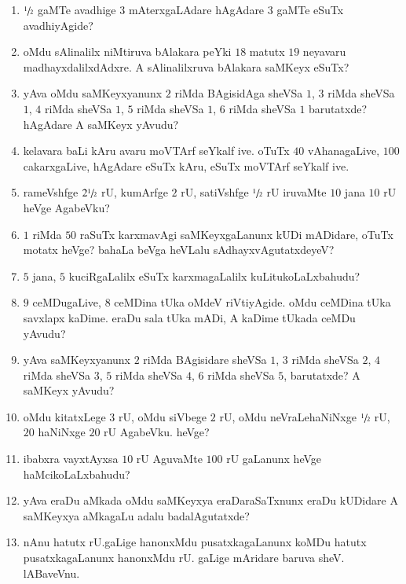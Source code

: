 \begin{enumerate}
\item $\sfrac{1}{2}$ gaMTe avadhige $3$ mAterxgaLAdare hAgAdare $3$ gaMTe eSuTx avadhiyAgide?

\item oMdu sAlinalilx niMtiruva bAlakara peYki $18$ matutx $19$ neyavaru madhayxdalilxdAdxre. A sAlinalilxruva bAlakara saMKeyx eSuTx?

\item yAva oMdu saMKeyxyanunx $2$ riMda BAgisidAga sheVSa $1$, $3$ riMda sheVSa $1$, $4$ riMda sheVSa $1$, $5$ riMda sheVSa $1$, $6$ riMda sheVSa $1$ barutatxde? hAgAdare A saMKeyx yAvudu?

\item kelavara baLi kAru avaru moVTArf seYkalf ive. oTuTx $40$ vAhanagaLive, $100$ cakarxgaLive, hAgAdare eSuTx kAru, eSuTx moVTArf seYkalf ive.

\item rameVshfge $2\sfrac{1}{2}$ rU, kumArfge $2$ rU, satiVshfge $\sfrac{1}{2}$ rU iruvaMte $10$ jana $10$ rU heVge AgabeVku?

\item $1$ riMda $50$ raSuTx karxmavAgi saMKeyxgaLanunx kUDi mADidare, oTuTx motatx heVge? bahaLa beVga heVLalu sAdhayxvAgutatxdeyeV?

\item $5$ jana, $5$ kuciRgaLalilx eSuTx karxmagaLalilx kuLitukoLaLxbahudu?

\item $9$ ceMDugaLive, $8$ ceMDina tUka oMdeV riVtiyAgide. oMdu ceMDina tUka savxlapx kaDime. eraDu sala tUka mADi, A kaDime tUkada ceMDu yAvudu?

\item yAva saMKeyxyanunx $2$ riMda BAgisidare sheVSa $1$, $3$ riMda sheVSa $2$, $4$ riMda sheVSa $3$, $5$ riMda sheVSa $4$, $6$ riMda sheVSa $5$, barutatxde? A saMKeyx yAvudu?

\item oMdu kitatxLege $3$ rU, oMdu siVbege $2$ rU, oMdu neVraLehaNiNxge $\sfrac{1}{2}$ rU, $20$ haNiNxge $20$ rU AgabeVku. heVge?

\item ibabxra vayxtAyxsa $10$ rU AguvaMte $100$ rU gaLanunx heVge haMcikoLaLxbahudu?

\item yAva eraDu aMkada oMdu saMKeyxya eraDaraSaTxnunx eraDu kUDidare A saMKeyxya aMkagaLu adalu badalAgutatxde?

\item nAnu hatutx rU.gaLige hanonxMdu pusatxkagaLanunx koMDu hatutx pusatxkagaLanunx hanonxMdu rU. gaLige mAridare baruva sheV. lABaveVnu.


\end{enumerate}
